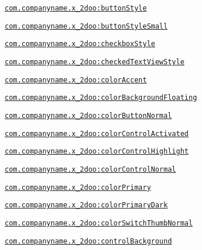 {\tt \hyperlink{classandroid_1_1support_1_1v4_1_1_r_1_1styleable_a567eb6928ba9055a784ae2ad69d63f8}{com.companyname.x\_\-2doo:buttonStyle}}

{\tt \hyperlink{classandroid_1_1support_1_1v4_1_1_r_1_1styleable_71e1206792e08e069496577fcab26e1b}{com.companyname.x\_\-2doo:buttonStyleSmall}}

{\tt \hyperlink{classandroid_1_1support_1_1v4_1_1_r_1_1styleable_2952864b487c0fdf826370ab068042b3}{com.companyname.x\_\-2doo:checkboxStyle}}

{\tt \hyperlink{classandroid_1_1support_1_1v4_1_1_r_1_1styleable_504638bb33551868625294f24e6d75c7}{com.companyname.x\_\-2doo:checkedTextViewStyle}}

{\tt \hyperlink{classandroid_1_1support_1_1v4_1_1_r_1_1styleable_3b87ab5d2175f20e4b41056387826bdc}{com.companyname.x\_\-2doo:colorAccent}}

{\tt \hyperlink{classandroid_1_1support_1_1v4_1_1_r_1_1styleable_2345bf81c44b196ed19b9beae5d073b2}{com.companyname.x\_\-2doo:colorBackgroundFloating}}

{\tt \hyperlink{classandroid_1_1support_1_1v4_1_1_r_1_1styleable_9222a7848886917a4f8f848b38a41538}{com.companyname.x\_\-2doo:colorButtonNormal}}

{\tt \hyperlink{classandroid_1_1support_1_1v4_1_1_r_1_1styleable_2d7dc080e71e4c68a0321538983ca317}{com.companyname.x\_\-2doo:colorControlActivated}}

{\tt \hyperlink{classandroid_1_1support_1_1v4_1_1_r_1_1styleable_346d6c8a5cb33583cb24fea2db2499ae}{com.companyname.x\_\-2doo:colorControlHighlight}}

{\tt \hyperlink{classandroid_1_1support_1_1v4_1_1_r_1_1styleable_dbb405fc0a9198e2e1ebbedf54fa8518}{com.companyname.x\_\-2doo:colorControlNormal}}

{\tt \hyperlink{classandroid_1_1support_1_1v4_1_1_r_1_1styleable_000f8fd391639a0e396991fb848871f7}{com.companyname.x\_\-2doo:colorPrimary}}

{\tt \hyperlink{classandroid_1_1support_1_1v4_1_1_r_1_1styleable_d4bbe6369273502bd320159d8f9742fb}{com.companyname.x\_\-2doo:colorPrimaryDark}}

{\tt \hyperlink{classandroid_1_1support_1_1v4_1_1_r_1_1styleable_6ea63f1233fe0a7b2a627bae8dbdb446}{com.companyname.x\_\-2doo:colorSwitchThumbNormal}}

{\tt \hyperlink{classandroid_1_1support_1_1v4_1_1_r_1_1styleable_b1ed611d790b8dc74dd266f0047196a2}{com.companyname.x\_\-2doo:controlBackground}}

